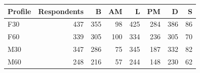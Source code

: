 \begin{tabularx}{\textwidth}{lrrrrrrr}
\toprule
Profile & Respondents & B & AM & L & PM & D & S \\
\midrule
F30 & 437 & 355 & 98 & 425 & 284 & 386 & 86 \\
\midrule
F60 & 339 & 305 & 100 & 334 & 236 & 305 & 70 \\
\midrule
M30 & 347 & 286 & 75 & 345 & 187 & 332 & 82 \\
\midrule
M60 & 248 & 216 & 57 & 244 & 148 & 230 & 62 \\
\midrule
\bottomrule
\end{tabularx}
